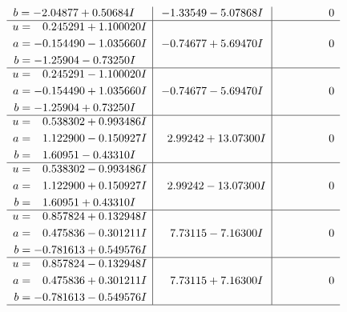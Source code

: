 \documentclass[1p]{elsarticle_modified}
\theoremstyle{definition}
\begin{document}
$$\begin{array}{c|c|c}
\begin{aligned}
b &= -2.04877 + 0.50684 I\end{aligned}
 & -1.33549 - 5.07868 I & \phantom{-0.000000 } 0 \\ \hline\begin{aligned}
u &= \phantom{-}0.245291 + 1.100020 I \\
a &= -0.154490 - 1.035660 I \\
b &= -1.25904 - 0.73250 I\end{aligned}
 & -0.74677 + 5.69470 I & \phantom{-0.000000 } 0 \\ \hline\begin{aligned}
u &= \phantom{-}0.245291 - 1.100020 I \\
a &= -0.154490 + 1.035660 I \\
b &= -1.25904 + 0.73250 I\end{aligned}
 & -0.74677 - 5.69470 I & \phantom{-0.000000 } 0 \\ \hline\begin{aligned}
u &= \phantom{-}0.538302 + 0.993486 I \\
a &= \phantom{-}1.122900 - 0.150927 I \\
b &= \phantom{-}1.60951 - 0.43310 I\end{aligned}
 & \phantom{-}2.99242 + 13.07300 I & \phantom{-0.000000 } 0 \\ \hline\begin{aligned}
u &= \phantom{-}0.538302 - 0.993486 I \\
a &= \phantom{-}1.122900 + 0.150927 I \\
b &= \phantom{-}1.60951 + 0.43310 I\end{aligned}
 & \phantom{-}2.99242 - 13.07300 I & \phantom{-0.000000 } 0 \\ \hline\begin{aligned}
u &= \phantom{-}0.857824 + 0.132948 I \\
a &= \phantom{-}0.475836 - 0.301211 I \\
b &= -0.781613 + 0.549576 I\end{aligned}
 & \phantom{-}7.73115 - 7.16300 I & \phantom{-0.000000 } 0 \\ \hline\begin{aligned}
u &= \phantom{-}0.857824 - 0.132948 I \\
a &= \phantom{-}0.475836 + 0.301211 I \\
b &= -0.781613 - 0.549576 I\end{aligned}
 & \phantom{-}7.73115 + 7.16300 I & \phantom{-0.000000 } 0\\
 \hline 
 \end{array}$$\newpage$$\begin{array}{c|c|c}  

\end{array}$$
\end{document}
